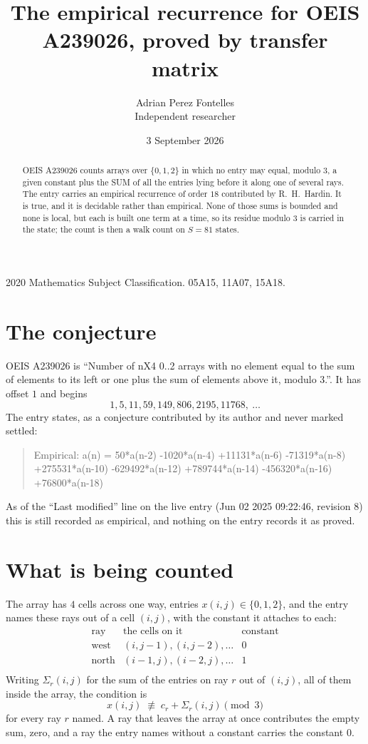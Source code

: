 \documentclass[11pt,a4paper]{article}
\title{The empirical recurrence for OEIS A239026, proved by transfer matrix}
\author{Adrian Perez Fontelles\\ \small Independent researcher}
\date{3 September 2026}
\theoremstyle{plain}
\theoremstyle{definition}
\begin{document}
\maketitle

\begin{abstract}
OEIS A239026 counts arrays over $\{0,1,2\}$ in which no entry may equal, modulo $3$, a given
constant plus the SUM of all the entries lying before it along one of several rays. The entry
carries an empirical recurrence of order $18$ contributed by R.~H.~Hardin. It is true, and
it is decidable rather than empirical. None of those sums is bounded and none is local, but
each is built one term at a time, so its residue modulo $3$ is carried in the state; the
count is then a walk count on $S=81$ states.
\end{abstract}

\noindent\small 2020 Mathematics Subject Classification. 05A15, 11A07, 15A18.\normalsize

\section{The conjecture}

OEIS A239026 is ``Number of nX4 0..2 arrays with no element equal to the sum of elements to its left or one plus the sum of elements above it, modulo 3.''. It has offset $1$ and begins
\[
1, 5, 11, 59, 149, 806, 2195, 11768,\ \dots
\]
The entry states, as a conjecture contributed by its author and never marked settled:
\begin{quote}
Empirical: a(n) = 50*a(n-2) -1020*a(n-4) +11131*a(n-6) -71319*a(n-8) +275531*a(n-10) -629492*a(n-12) +789744*a(n-14) -456320*a(n-16) +76800*a(n-18)
\end{quote}
As of the ``Last modified'' line on the live entry (Jun 02 2025 09:22:46, revision 8) this is still
recorded as empirical, and nothing on the entry records it as proved.

\section{What is being counted}

The array has $4$ cells across one way, entries $x(i,j)\in\{0,1,2\}$, and the entry names these
rays out of a cell $(i,j)$, with the constant it attaches to each:
\[
\begin{array}{lll}
\text{ray} & \text{the cells on it} & \text{constant} \\[2pt]
\text{west} & (i,j-1),(i,j-2),\dots & 0 \\
\text{north} & (i-1,j),(i-2,j),\dots & 1 \\
\end{array}
\]
Writing $\Sigma_r(i,j)$ for the sum of the entries on ray $r$ out of $(i,j)$, all of them
inside the array, the condition is
\[
x(i,j)\;\not\equiv\;c_r+\Sigma_r(i,j) \pmod{3}
\]
for every ray $r$ named. A ray that leaves the array at once contributes the empty sum,
zero, and a ray the entry names without a constant carries the constant $0$.
\end{document}
